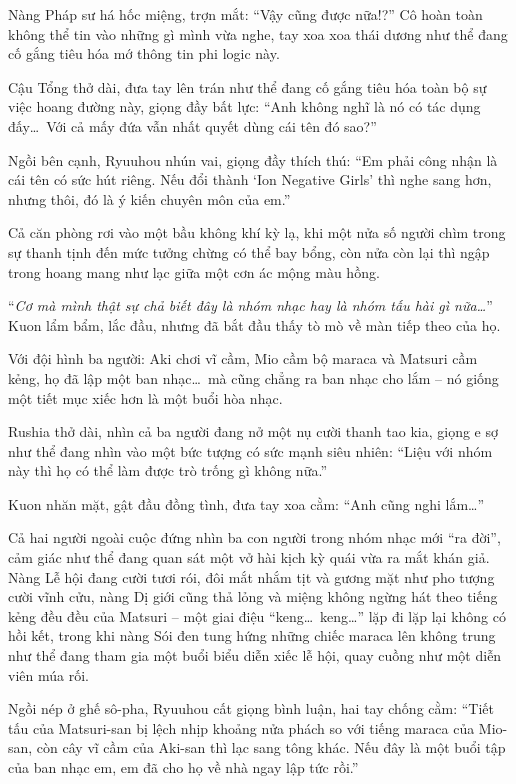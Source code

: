 \documentclass[../main.tex]{subfiles}
\begin{document}
Nàng Pháp sư há hốc miệng, trợn mắt: ``Vậy cũng được nữa!?'' Cô hoàn toàn không thể tin vào những gì mình vừa nghe, tay xoa xoa thái dương như thể đang cố gắng tiêu hóa mớ thông tin phi logic này.

Cậu Tổng thở dài, đưa tay lên trán như thể đang cố gắng tiêu hóa toàn bộ sự việc hoang đường này, giọng đầy bất lực: ``Anh không nghĩ là nó có tác dụng đấy\dots\ Với cả mấy đứa vẫn nhất quyết dùng cái tên đó sao?''

Ngồi bên cạnh, Ryuuhou nhún vai, giọng đầy thích thú: ``Em phải công nhận là cái tên có sức hút riêng. Nếu đổi thành `Ion Negative Girls' thì nghe sang hơn, nhưng thôi, đó là ý kiến chuyên môn của em.''

Cả căn phòng rơi vào một bầu không khí kỳ lạ, khi một nửa số người chìm trong sự thanh tịnh đến mức tưởng chừng có thể bay bổng, còn nửa còn lại thì ngập trong hoang mang như lạc giữa một cơn ác mộng màu hồng.

``\textit{Cơ mà mình thật sự chả biết đây là nhóm nhạc hay là nhóm tấu hài gì nữa\dots}'' Kuon lẩm bẩm, lắc đầu, nhưng đã bắt đầu thấy tò mò về màn tiếp theo của họ.

\omk

Với đội hình ba người: Aki chơi vĩ cầm, Mio cầm bộ maraca và Matsuri cầm kẻng, họ đã lập một ban nhạc\dots\ mà cũng chẳng ra ban nhạc cho lắm – nó giống một tiết mục xiếc hơn là một buổi hòa nhạc.

Rushia thở dài, nhìn cả ba người đang nở một nụ cười thanh tao kia, giọng e sợ như thể đang nhìn vào một bức tượng có sức mạnh siêu nhiên: ``Liệu với nhóm này thì họ có thể làm được trò trống gì không nữa.''

Kuon nhăn mặt, gật đầu đồng tình, đưa tay xoa cằm: ``Anh cũng nghi lắm\dots''

Cả hai người ngoài cuộc đứng nhìn ba con người trong nhóm nhạc mới ``ra đời'', cảm giác như thể đang quan sát một vở hài kịch kỳ quái vừa ra mắt khán giả. Nàng Lễ hội đang cười tươi rói, đôi mắt nhắm tịt và gương mặt như pho tượng cười vĩnh cửu, nàng Dị giới cũng thả lỏng và miệng không ngừng hát theo tiếng kẻng đều đều của Matsuri – một giai điệu ``keng\dots\ keng\dots'' lặp đi lặp lại không có hồi kết, trong khi nàng Sói đen tung hứng những chiếc maraca lên không trung như thể đang tham gia một buổi biểu diễn xiếc lễ hội, quay cuồng như một diễn viên múa rối.

Ngồi nép ở ghế sô-pha, Ryuuhou cất giọng bình luận, hai tay chống cằm: ``Tiết tấu của Matsuri-san bị lệch nhịp khoảng nửa phách so với tiếng maraca của Mio-san, còn cây vĩ cầm của Aki-san thì lạc sang tông khác. Nếu đây là một buổi tập của ban nhạc em, em đã cho họ về nhà ngay lập tức rồi.''
\end{document}
